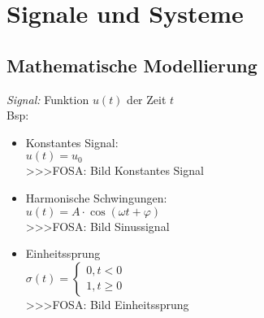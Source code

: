 



\section{Signale und Systeme}

\subsection{Mathematische Modellierung}
\emph{Signal: }Funktion $u(t)$ der Zeit $t$\\
Bsp: 
\begin{itemize}
  \item Konstantes Signal: \\
        $u(t) = u_0$ \\
        >>>FOSA: Bild Konstantes Signal
  \item Harmonische Schwingungen: \\
        $u(t) = A \cdot \cos(\omega t + \varphi)$ \\
        >>>FOSA: Bild Sinussignal
  \item Einheitssprung \\
        $\sigma(t) = 
        \left\lbrace 
        \begin{array}{l}
        0, t<0 \\
        1, t \geq 0
        \end{array} 
        \right. $\\
        >>>FOSA: Bild Einheitssprung
\end{itemize}

